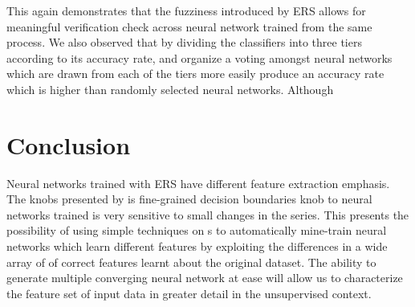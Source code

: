 \documentclass[10pt,twocolumn,letterpaper]{article}
\begin{document}
This again demonstrates that the fuzziness introduced by ERS allows for meaningful verification check across neural network trained from the same process. We also observed that by dividing the classifiers into three tiers according to its accuracy rate, and organize a voting amongst neural networks which are drawn from each of the tiers more easily produce an accuracy rate which is higher than randomly selected neural networks. Although 

\section{Conclusion}
Neural networks trained with ERS have different feature extraction emphasis. The knobs presented by  is fine-grained decision boundaries knob to neural networks trained is very sensitive to small changes in the series.  This presents the possibility of using simple techniques on s to automatically mine-train neural networks which learn different features by exploiting the differences in a wide array of of correct features learnt about the original dataset. The ability to generate multiple converging neural network at ease will allow us to characterize the feature set of input data in greater detail in the unsupervised context.
{\small


}
\end{document}
